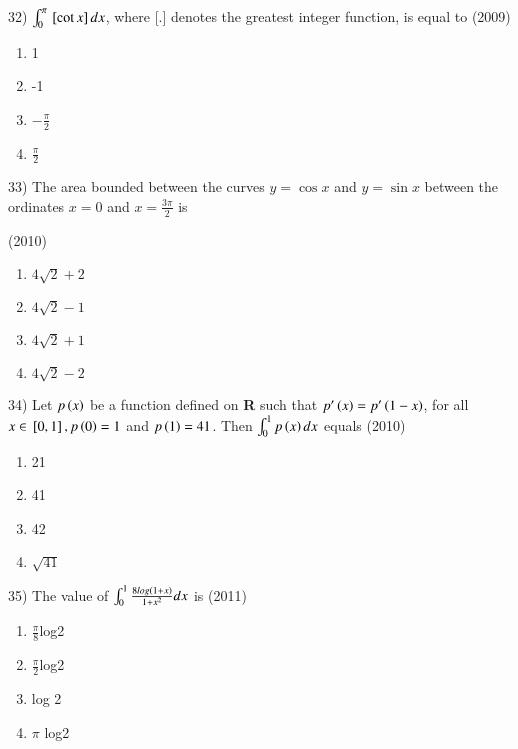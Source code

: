 \documentclass[journal,12pt,twocolumn]{IEEEtran}
\theoremstyle{remark}
\begin{document}
32)
	 $\int_0^\pi{}\left[\cot x\right]dx$, where [.] denotes the greatest integer function, is equal to
		\hfill{(2009)}

		\begin{multicols}{4}
			\begin{enumerate}[label=(\alph*)]
				\item 1
				\item -1
				\item $-\frac{\pi}{2}$
				\item $\frac{\pi}{2}$
			\end{enumerate}
		\end{multicols}

33)
	 The area bounded between the curves $y=\cos x$ and $y=\sin x$ between the ordinates $x=0$ and $x=\frac{3\pi}{2}$ is

		\hfill{(2010)}

		\begin{multicols}{2}
			\begin{enumerate}[label=(\alph*)]
				\item $4\sqrt{2}+2$
				\item $4\sqrt{2}-1$
				\item $4\sqrt{2}+1$
				\item $4\sqrt{2}-2$
			\end{enumerate}
		\end{multicols}

34)
	 Let $p\left(x\right)$ be a function defined on \textbf{R} such that $p'\left(x\right)=p'\left(1-x\right)$, for all $x\in{}\left[0,1\right],p\left(0\right)=1$ and $p\left(1\right)=41$. Then $\int_0^1p\left(x\right)dx$ equals
		\hfill{(2010)}

		\begin{multicols}{4}
			\begin{enumerate}[label=(\alph*)]
				\item 21
				\item 41
				\item 42
				\item $\sqrt{41}$
			\end{enumerate}
		\end{multicols}

35)
	 The value of $\int_0^1\frac{8log\left(1+x\right)}{1+x^2}dx$ is
		\hfill{(2011)}

		\begin{multicols}{2}
			\begin{enumerate}[label=(\alph*)]
				\item $\frac{\pi}{8}$log2
				\item $\frac{\pi}{2}$log2
				\item log 2
				\item $\pi$ log2
			\end{enumerate}
		\end{multicols}
\end{document}

